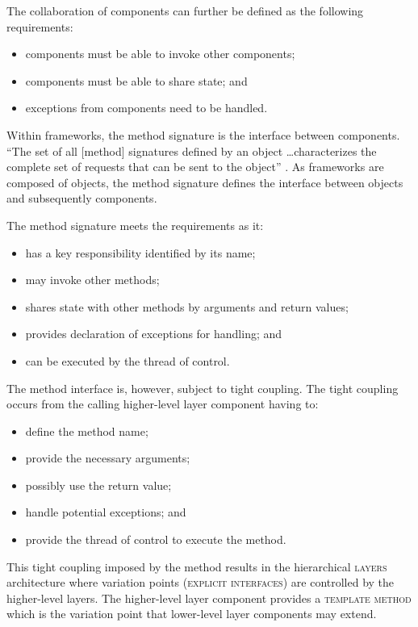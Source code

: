 \documentclass[prodmode]{style/acmlarge}
\begin{document}
The collaboration of components can further be defined as the following
requirements:
\begin{itemize}
  \item components must be able to invoke other components;
  \item components must be able to share state; and
  \item exceptions from components need to be handled.
\end{itemize}

Within frameworks, the method signature is the interface between components.
``The set of all [method] signatures defined by an object \ldots characterizes
the complete set of requests that can be sent to the object'' \cite[p. 13]{gof}.
As frameworks are composed of objects, the method signature defines the
interface between objects and subsequently components.

The method signature meets the requirements as it:
\begin{itemize}
  \item has a key responsibility identified by its name;
  \item may invoke other methods;
  \item shares state with other methods by arguments and return values;
  \item provides declaration of exceptions for handling; and
  \item can be executed by the thread of control.
\end{itemize}

The method interface is, however, subject to tight coupling.  The tight
coupling occurs from the calling higher-level layer component having to:
\begin{itemize}
  \item define the method name;
  \item provide the necessary arguments;
  \item possibly use the return value;
  \item handle potential exceptions; and
  \item provide the thread of control to execute the method.
\end{itemize}

This tight coupling imposed by the method results in the hierarchical
\textsc{layers} architecture where variation points (\textsc{explicit
interfaces}) are controlled by the higher-level layers.  The higher-level layer
component provides a \textsc{template method} \cite{gof} which is the variation
point that lower-level layer components may extend.
\end{document}
